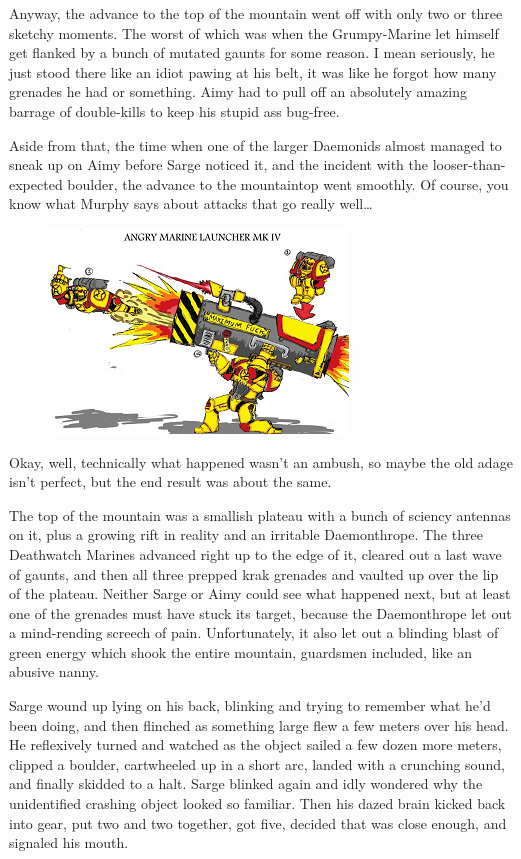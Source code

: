 Anyway, the advance to the top of the mountain went off with only two or three sketchy moments. 
The worst of which was when the Grumpy-Marine let himself get flanked by a bunch of mutated gaunts for some reason. 
I mean seriously, he just stood there like an idiot pawing at his belt, it was like he forgot how many grenades he had or something. 
Aimy had to pull off an absolutely amazing barrage of double-kills to keep his stupid ass bug-free. 


 Aside from that, the time when one of the larger Daemonids almost managed to sneak up on Aimy before Sarge noticed it, and the incident with the looser-than-expected boulder, the advance to the mountaintop went smoothly. 
Of course, you know what Murphy says about attacks that go really well…

\begin{figure}
	\begin{center}
		\includegraphics[width=\figwidth]{pics/16/49.png}
	\end{center}
\end{figure}
Okay, well, technically what happened wasn't an ambush, so maybe the old adage isn't perfect, but the end result was about the same.

The top of the mountain was a smallish plateau with a bunch of sciency antennas on it, plus a growing rift in reality and an irritable Daemonthrope. 
The three Deathwatch Marines advanced right up to the edge of it, cleared out a last wave of gaunts, and then all three prepped krak grenades and vaulted up over the lip of the plateau. 
Neither Sarge or Aimy could see what happened next, but at least one of the grenades must have stuck its target, because the Daemonthrope let out a mind-rending screech of pain. 
Unfortunately, it also let out a blinding blast of green energy which shook the entire mountain, guardsmen included, like an abusive nanny.

Sarge wound up lying on his back, blinking and trying to remember what he'd been doing, and then flinched as something large flew a few meters over his head. 
He reflexively turned and watched as the object sailed a few dozen more meters, clipped a boulder, cartwheeled up in a short arc, landed with a crunching sound, and finally skidded to a halt. 
Sarge blinked again and idly wondered why the unidentified crashing object looked so familiar. 
Then his dazed brain kicked back into gear, put two and two together, got five, decided that was close enough, and signaled his mouth.

